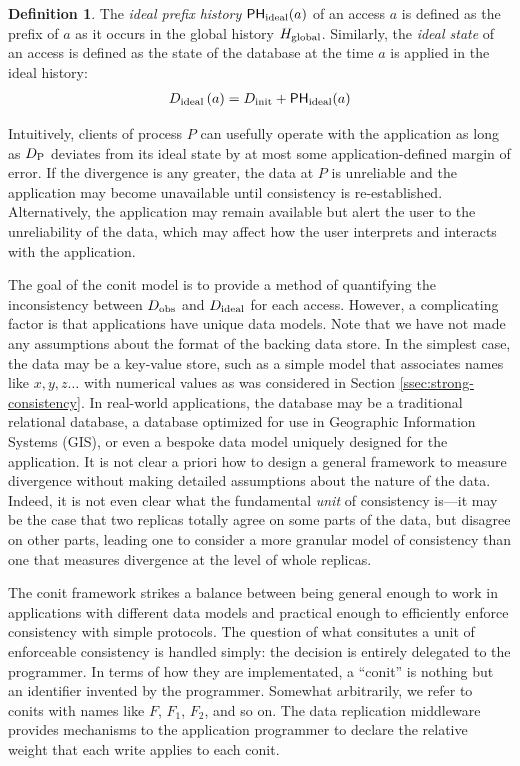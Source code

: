 \documentclass[]             %
{NASA}                       %
\theoremstyle{definition}
\newtheorem{definition}[theorem]{Definition}
\begin{document}
\begin{definition}
  The \emph{ideal prefix history} $\mathsf{PH}_{\mathrm{ideal}}{\left(a\right)}$ of an
  access $a$ is defined as the prefix of $a$ as it occurs in the
  global history $H_\mathrm{global}$. Similarly, the \emph{ideal state} of an
  access is defined as the state of the database at the time $a$ is
  applied in the ideal history:
\begin{gather}
  D_{\textrm{ideal}}\left(a\right) = D_\textrm{init} + \mathsf{PH}_{\mathrm{ideal}}{\left(a\right)} \label{eq:conit-D-ideal-at}
\end{gather}
\end{definition}

Intuitively, clients of process $P$ can usefully operate with the
application as long as $D_{\textrm{P}}$ deviates from its ideal state by
at most some application-defined margin of error. If the divergence is
any greater, the data at $P$ is unreliable and the application may
become unavailable until consistency is re-established. Alternatively,
the application may remain available but alert the user to the
unreliability of the data, which may affect how the user interprets
and interacts with the application.

The goal of the conit model is to provide a method of quantifying the
inconsistency between $D_{\textrm{obs}}$ and $D_{\textrm{ideal}}$ for each access. However,
a complicating factor is that applications have unique data
models. Note that we have not made any assumptions about the format of
the backing data store. In the simplest case, the data may be a
key-value store, such as a simple model that associates names like
$x, y, z\ldots$ with numerical values as was considered in Section
\ref{ssec:strong-consistency}. In real-world applications, the
database may be a traditional relational database, a database
optimized for use in Geographic Information Systems (GIS), or even a
bespoke data model uniquely designed for the application. It is not
clear a priori how to design a general framework to measure divergence
without making detailed assumptions about the nature of the
data. Indeed, it is not even clear what the fundamental \emph{unit} of
consistency is---it may be the case that two replicas totally agree on
some parts of the data, but disagree on other parts, leading one to
consider a more granular model of consistency than one that measures
divergence at the level of whole replicas.

The conit framework strikes a balance between being general enough to
work in applications with different data models and practical enough
to efficiently enforce consistency with simple protocols. The question
of what consitutes a unit of enforceable consistency is handled
simply: the decision is entirely delegated to the programmer. In terms
of how they are implementated, a ``conit'' is nothing but an
identifier invented by the programmer. Somewhat arbitrarily, we refer
to conits with names like $F$, $F_1$, $F_2$, and so on. The data
replication middleware provides mechanisms to the application
programmer to declare the relative weight that each write applies to
each conit.
\end{document}
